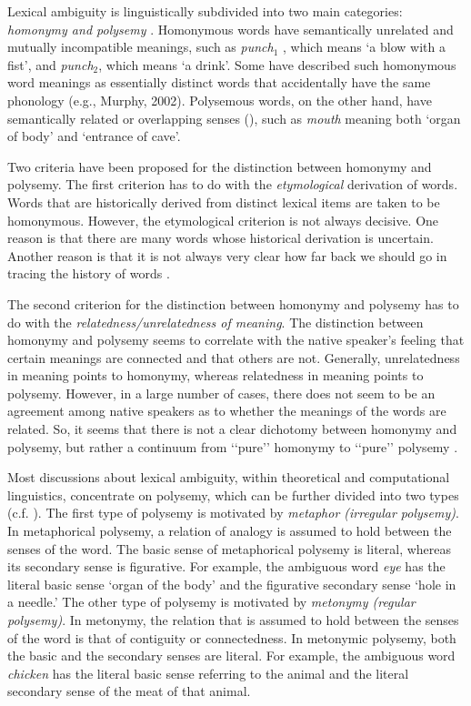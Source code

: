 \documentclass[11pt]{article}
\begin{document}
\label{sec:bground}

Lexical ambiguity is linguistically subdivided into two main categories:
\emph{homonymy and polysemy} \citep{Cruse:2004}. Homonymous words have
semantically unrelated and mutually incompatible meanings, such as
\emph{punch$_1$} , which means `a blow with a fist', and \emph{punch$_2$},
which means `a drink'. Some have described such homonymous word meanings as
essentially distinct words that accidentally have the same phonology (e.g.,
Murphy, 2002). Polysemous words, on the other hand, have semantically related
or overlapping senses (\cite{Cruse:2004,Jackendoff:2002, Pustejovsky:1995}),
such as \emph{mouth} meaning both `organ of body' and `entrance of cave'.

Two criteria have been proposed for the distinction between homonymy and
polysemy. The first criterion has to do with the \emph{etymological} derivation
of words. Words that are historically derived from distinct lexical items are
taken to be homonymous. However, the etymological criterion is not always
decisive. One reason is that there are many words whose historical derivation
is uncertain. Another reason is that it is not always very clear how far back
we should go in tracing the history of words \citep{Lyons:1977}.

The second criterion for the distinction between homonymy and polysemy has to
do with the \emph{relatedness/unrelatedness of meaning}.  The distinction
between homonymy and polysemy seems to correlate with the native speaker’s
feeling that certain meanings are connected and that others are not. Generally,
unrelatedness in meaning points to homonymy, whereas relatedness in meaning
points to polysemy.  However, in a large number of cases, there does not seem
to be an agreement among native speakers as to whether the meanings of the
words are related. So, it seems that there is not a clear dichotomy between
homonymy and polysemy, but rather a continuum from ‘‘pure’’ homonymy to
‘‘pure’’ polysemy \citep{Lyons:1977}.

Most discussions about lexical ambiguity, within theoretical and computational
linguistics, concentrate on polysemy, which can be further divided into two
types (c.f. \cite{Apresjan:1974,Pustejovsky:1995}). The first type of polysemy
is motivated by \emph{metaphor (irregular polysemy)}. In metaphorical polysemy,
a relation of analogy is assumed to hold between the senses of the word. The
basic sense of metaphorical polysemy is literal, whereas its secondary sense is
figurative. For example, the ambiguous word \emph{eye} has the literal basic
sense  `organ of the body' and the figurative secondary sense `hole in a
needle.' The other type of polysemy is motivated by \emph{metonymy (regular
polysemy)}. In metonymy, the relation that is assumed to hold between the
senses of the word is that of contiguity or connectedness.
In metonymic polysemy, both the basic and the secondary senses are literal. For
example, the ambiguous word \emph{chicken} has the literal basic sense
referring to the animal and the literal secondary sense of the meat of that
animal.
\end{document}
